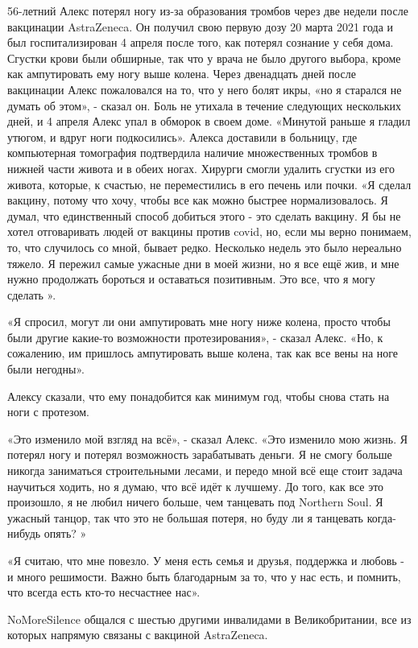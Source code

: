 56-летний Алекс потерял ногу из-за образования тромбов через две недели после
вакцинации AstraZeneca. Он получил свою первую дозу 20 марта 2021 года и был
госпитализирован 4 апреля после того, как потерял сознание у себя дома. Сгустки
крови были обширные, так что у врача не было другого выбора, кроме как
ампутировать ему ногу выше колена. Через двенадцать дней после вакцинации Алекс
пожаловался на то, что у него болят икры, «но я старался не думать об этом», -
сказал он. Боль не утихала в течение следующих нескольких дней, и 4 апреля Алекс
упал в обморок в своем доме. «Минутой раньше я гладил утюгом, и вдруг ноги
подкосились». Алекса доставили в больницу, где компьютерная томография
подтвердила наличие множественных тромбов в нижней части живота и в обеих
ногах. Хирурги смогли удалить сгустки из его живота, которые, к счастью, не
переместились в его печень или почки. «Я сделал вакцину, потому что хочу, чтобы
все как можно быстрее нормализовалось. Я думал, что единственный способ добиться
этого - это сделать вакцину. Я бы не хотел отговаривать людей от вакцины против
covid, но, если мы верно понимаем, то, что случилось со мной, бывает
редко. Несколько недель это было нереально тяжело. Я пережил самые ужасные дни в
моей жизни, но я все ещё жив, и мне нужно продолжать бороться и оставаться
позитивным. Это все, что я могу сделать ».

«Я спросил, могут ли они ампутировать мне ногу ниже колена, просто чтобы были
другие какие-то возможности протезирования», - сказал Алекс. «Но, к сожалению,
им пришлось ампутировать выше колена, так как все вены на ноге были негодны».

Алексу сказали, что ему понадобится как минимум год, чтобы снова стать на ноги с
протезом.

«Это изменило мой взгляд на всё», - сказал Алекс. «Это изменило мою жизнь. Я
потерял ногу и потерял возможность зарабатывать деньги. Я не смогу больше
никогда заниматься строительными лесами, и передо мной всё еще стоит задача
научиться ходить, но я думаю, что всё идёт к лучшему. До того, как все это
произошло, я не любил ничего больше, чем танцевать под Northern Soul. Я ужасный
танцор, так что это не большая потеря, но буду ли я танцевать когда-нибудь
опять? »

«Я считаю, что мне повезло. У меня есть семья и друзья, поддержка и любовь - и
много решимости. Важно быть благодарным за то, что у нас есть, и помнить, что
всегда есть кто-то несчастнее нас».

NoMoreSilence общался с шестью другими инвалидами в Великобритании, все из
которых напрямую связаны с вакциной AstraZeneca.

